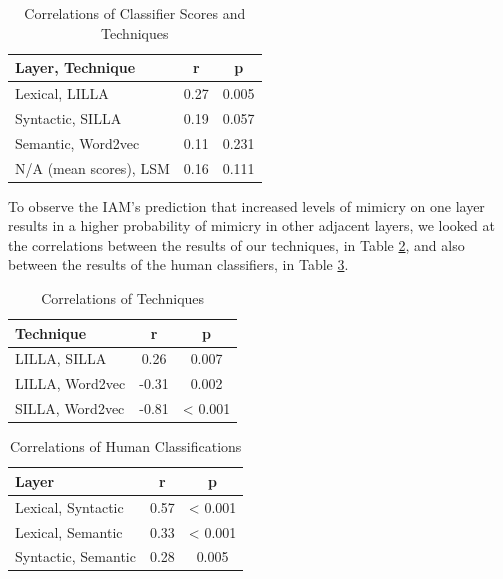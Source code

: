 \documentclass[conference]{IEEEtran}
\begin{document}
\begin{table}[!t]
\caption{Correlations of Classifier Scores and Techniques}
\label{scores_techniques}
\centering
\renewcommand{\arraystretch}{1.2}
\begin{tabular}{l c c}
Layer, Technique & r & p \\
\hline
Lexical, LILLA & 0.27 & 0.005 \\
Syntactic, SILLA & 0.19 & 0.057 \\
Semantic, Word2vec & 0.11 & 0.231 \\
N/A (mean scores), LSM & 0.16 & 0.111 \\
\end{tabular}
\end{table}

To observe the IAM's prediction that increased levels of mimicry on one layer results in a higher probability of mimicry in other adjacent layers, we looked at the correlations between the results of our techniques, in Table \ref{techniques}, and also between the results of the human classifiers, in Table \ref{classifications}.

\begin{table}[!t]
\caption{Correlations of Techniques}
\label{techniques}
\centering
\renewcommand{\arraystretch}{1.2}
\begin{tabular}{l c c}
Technique & r & p \\
\hline
LILLA, SILLA & 0.26 & 0.007 \\
LILLA, Word2vec & -0.31 & 0.002 \\
SILLA, Word2vec & -0.81 & < 0.001
\end{tabular}
\end{table}

\begin{table}[!t]
\caption{Correlations of Human Classifications}
\label{classifications}
\centering
\renewcommand{\arraystretch}{1.2}
\begin{tabular}{l c c}
Layer & r & p \\
\hline
Lexical, Syntactic & 0.57 & < 0.001 \\
Lexical, Semantic & 0.33 & < 0.001 \\
Syntactic, Semantic & 0.28 & 0.005
\end{tabular}
\end{table}
\end{document}

